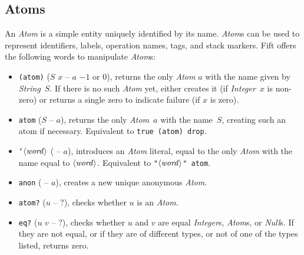 \documentclass[12pt,oneside]{article}
\def\mysubsection#1{\subsection{#1}\fancyhead[C]{\small{\textsc{\textrm{\thesubsection.} #1}}}}
\begin{document}
\mysubsection{Atoms}\label{p:atoms}
An {\em Atom\/} is a simple entity uniquely identified by its name. {\em Atom\/}s can be used to represent identifiers, labels, operation names, tags, and stack markers. Fift offers the following words to manipulate {\em Atom\/}s:
\begin{itemize}
\item {\tt (atom)} ($S$ $x$ -- $a$ $-1$ or $0$), returns the only {\em Atom\/} $a$ with the name given by {\em String\/}~$S$. If there is no such {\em Atom\/} yet, either creates it (if {\em Integer\/}~$x$ is non-zero) or returns a single zero to indicate failure (if $x$ is zero).
\item {\tt atom} ($S$ -- $a$), returns the only {\em Atom\/}~$a$ with the name~$S$, creating such an atom if necessary. Equivalent to {\tt true (atom) drop}.
\item {\tt `$\langle\textit{word\/}\rangle$} ( -- $a$), introduces an {\em Atom\/} literal, equal to the only {\em Atom\/} with the name equal to $\langle\textit{word\/}\rangle$. Equivalent to {\tt "$\langle\textit{word\/}\rangle$" atom}. 
\item {\tt anon} ( -- $a$), creates a new unique anonymous {\em Atom}.
\item {\tt atom?} ($u$ -- $?$), checks whether $u$ is an {\em Atom}.
\item {\tt eq?} ($u$ $v$ -- $?$), checks whether $u$ and $v$ are equal {\em Integer\/}s, {\em Atom\/}s, or {\em Null\/}s. If they are not equal, or if they are of different types, or not of one of the types listed, returns zero.
\end{itemize}
\end{document}
